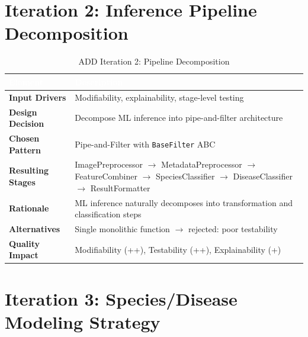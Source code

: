 \documentclass[11pt,a4paper,oneside]{report}
\newcommand{\code}[1]{\texttt{\footnotesize #1}}
\begin{document}
\section{Iteration 2: Inference Pipeline Decomposition}

\begin{table}[H]
\centering\footnotesize
\caption{ADD Iteration 2: Pipeline Decomposition}
\label{tab:add-iter2}
\begin{tabularx}{\textwidth}{>{\bfseries}p{2.8cm} X}
\toprule
\rowcolor{tableheader}
\textcolor{white}{Element} & \textcolor{white}{Description} \\
\midrule
Input Drivers     & Modifiability, explainability, stage-level testing \\
Design Decision   & Decompose ML inference into pipe-and-filter architecture \\
Chosen Pattern    & Pipe-and-Filter with \code{BaseFilter} ABC \\
Resulting Stages  & ImagePreprocessor $\to$ MetadataPreprocessor $\to$ FeatureCombiner $\to$ SpeciesClassifier $\to$ DiseaseClassifier $\to$ ResultFormatter \\
Rationale         & ML inference naturally decomposes into transformation and classification steps \\
Alternatives      & Single monolithic function $\to$ rejected: poor testability \\
Quality Impact    & Modifiability (++), Testability (++), Explainability (+) \\
\bottomrule
\end{tabularx}
\end{table}


\section{Iteration 3: Species/Disease Modeling Strategy}
\end{document}
